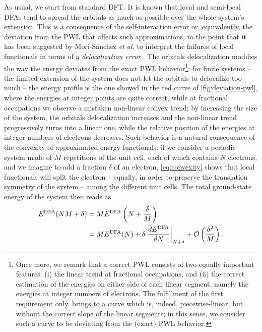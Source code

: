 As usual, we start from standard DFT. It is known that local and semi-local DFAs tend to spread the orbitals as much as possible over the whole system's extension. This is a consequence of the self-interaction error or, equivalently, the deviation from the PWL that affects such approximations, to the point that it has been suggested by Mori-S\'{a}nchez \emph{et al.} to interpret the failures of local functionals in terms of a \emph{delocalization error} \cite{mori-sanchez_localization_2008}. The orbitals delocalization modifies the way the energy deviates from the exact PWL behavior\footnote{Once more, we remark that a correct PWL consists of two equally important features: (i) the linear trend at fractional occupations, and (ii) the correct estimation of the energies on either side of each linear segment, namely the energies at integer numbers of electrons. The fulfillment of the first requirement only, brings to a curve which is, indeed, piecewise-linear, but without the correct slope of the linear segments; in this sense, we consider such a curve to be deviating from the (exact) PWL behavior.}: for finite systems -- the limited extension of the system does not let the orbitals to delocalize too much -- the energy profile is the one showed in the red curve of \cref{fig:deviation-pwl}, where the energies at integer points are quite correct, while at fractional occupations we observe a mistaken non-linear convex trend; by increasing the size of the system, the orbitals delocalization increases and the non-linear trend progressively turns into a linear one, while the relative position of the energies at integer numbers of electrons decreases. Such behavior is a natural consequence of the convexity of approximated energy functionals: if we consider a periodic system made of $M$ repetitions of the unit cell, each of which contains $N$ electrons, and we imagine to add a fraction $\delta$ of an electron, \cref{eq:convexity} shows that local functionals will split the electron -- equally, in order to preserve the translation symmetry of the system -- among the different unit cells. The total ground-state energy of the system then reads as \cite{mori-sanchez_localization_2008}
%
\begin{equation}
    \begin{split}
    E^{\rm DFA}(NM + \delta) &= M E^{\rm DFA}\left( N + \frac{\delta}{M} \right) \\
    &= ME^{\rm DFA}(N) + \delta \left. \frac{dE^{\rm DFA}}{dN} \right|_{N+\delta} + \mathcal{O} \left( \frac{\delta^2}{M} \right) .
    \end{split}
    \label{eq:pwl-convex-to-linear}
\end{equation}
